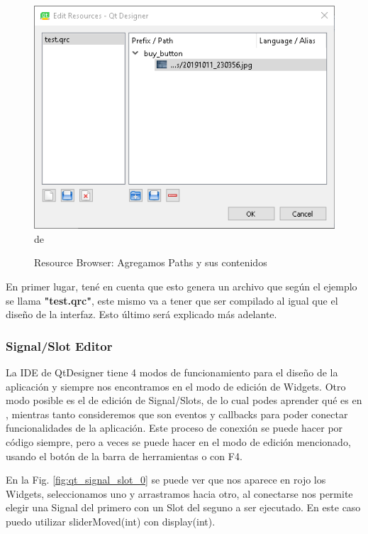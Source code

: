\begin{figure}[H]
    \centering
    \includegraphics[scale=0.7]{imagenes/qtdesigner/qt_resource_browser_2.PNG}de
    \caption{Resource Browser: Agregamos Paths y sus contenidos}
    \label{fig:qt_resources_2}
\end{figure}

En primer lugar, ten\'e en cuenta que esto genera un archivo que seg\'un el ejemplo se llama \textbf{"test.qrc"}, este mismo
va a tener que ser compilado al igual que el dise\~no de la interfaz. Esto \'ultimo ser\'a explicado m\'as adelante.

\subsubsection{Signal/Slot Editor}
La IDE de QtDesigner tiene 4 modos de funcionamiento para el dise\~no de la aplicaci\'on y siempre nos encontramos en el modo
de edici\'on de Widgets. Otro modo posible es el de edici\'on de Signal/Slots, de lo cual podes aprender qu\'e es en ,
mientras tanto consideremos que son eventos y callbacks para poder conectar funcionalidades de la aplicaci\'on. Este proceso de conexi\'on se puede hacer por c\'odigo
siempre, pero a veces se puede hacer en el modo de edici\'on mencionado, usando el bot\'on de la barra de herramientas o con F4.

En la Fig. \ref{fig:qt_signal_slot_0} se puede ver que nos aparece en rojo los Widgets, seleccionamos uno y arrastramos hacia otro,
al conectarse nos permite elegir una Signal del primero con un Slot del seguno a ser ejecutado. En este caso puedo utilizar sliderMoved(int)
con display(int).

